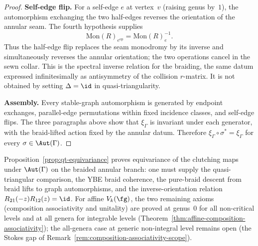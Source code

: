 \begin{proof}
\medskip
\noindent\textbf{Self-edge flip.}
For a self-edge $e$ at vertex~$v$ (raising genus by~$1$), the
automorphism exchanging the two half-edges reverses the orientation
of the annular seam.  The fourth hypothesis supplies
\[
\mathrm{Mon}(R)_{e^{\mathrm{op}}}
=\mathrm{Mon}(R)_e^{-1}.
\]
Thus the half-edge flip replaces the seam monodromy by its inverse
and simultaneously reverses the annular orientation; the two
operations cancel in the sewn collar.  This is the spectral inverse
relation for the braiding, the same datum expressed infinitesimally
as antisymmetry of the collision $r$-matrix.  It is not obtained by
setting $\Delta=\id$ in quasi-triangularity.

\medskip
\noindent\textbf{Assembly.}
Every stable-graph automorphism is generated by endpoint exchanges,
parallel-edge permutations within fixed incidence classes, and
self-edge flips.  The three paragraphs above show that $\xi_\Gamma$
is invariant under each generator, with the braid-lifted action fixed
by the annular datum.  Therefore
$\xi_\Gamma\circ\sigma^\ast=\xi_\Gamma$ for every
$\sigma\in\Aut(\Gamma)$.
\end{proof}

\begin{remark}
\label{rem:equivariance-scope}
Proposition~\ref{prop:qt-equivariance} proves equivariance of the
clutching maps under $\Aut(\Gamma)$ on the braided annular branch:
one must supply the quasi-triangular comparison, the YBE braid
coherence, the pure-braid descent from braid lifts to graph
automorphisms, and the inverse-orientation relation
$R_{21}(-z)R_{12}(z)=\id$.
For affine $V_k(\fg)$, the two remaining axioms (composition
associativity and unitality) are proved at genus~$0$ for all
non-critical levels and at all genera for integrable levels
(Theorem~\textup{\ref{thm:affine-composition-associativity}});
the all-genera case at generic non-integral level remains
open (the Stokes gap of
Remark~\textup{\ref{rem:composition-associativity-scope}}).
\end{remark}

